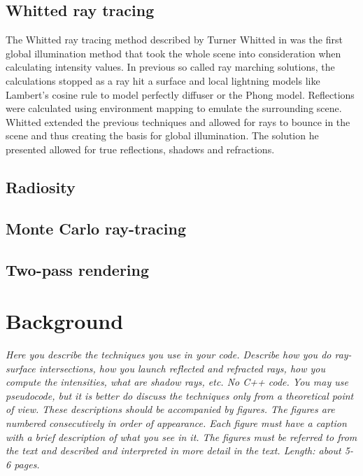\documentclass[]{report}   %
\begin{document}
\section{Whitted ray tracing}
The Whitted ray tracing method described by Turner Whitted in \cite{} was the first global illumination method that took the whole scene into consideration when calculating intensity values.
In previous so called ray marching solutions, the calculations stopped as a ray hit a surface and local lightning models like Lambert's cosine rule to model perfectly diffuser or the Phong model.
Reflections were calculated using environment mapping to emulate the surrounding scene.
Whitted extended the previous techniques and allowed for rays to bounce in the scene and thus creating the basis for global illumination.
The solution he presented allowed for true reflections, shadows and refractions.





\section{Radiosity}

\section{Monte Carlo ray-tracing}

\section{Two-pass rendering}


\chapter{Background}
\emph{Here you describe the techniques you use in your code. 
Describe how you do ray-surface intersections, how you launch reflected and refracted rays, how you compute the intensities, what are shadow rays, etc. No C++ code. 
You may use pseudocode, but it is better do discuss the techniques only from a theoretical point of view. 
These descriptions should be accompanied by figures. 
The figures are numbered consecutively in order of appearance. 
Each figure must have a caption with a brief description of what you see in it. 
The figures must be referred to from the text and described and interpreted in more detail in the text.
Length: about 5-6 pages.}
\end{document}
